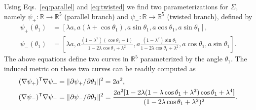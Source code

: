 Using Eqs.~\eqref{eq:parallel} and \eqref{eq:twisted} we find two parameterizations for $\Sigma$, namely $\psi_+: \mathbb{R} \to \mathbb{R}^5$ (parallel branch) and $\psi_-: \mathbb{R} \to \mathbb{R}^5$ (twisted branch), defined by
%
\begin{subequations}
  \begin{align}
    \psi_+(\theta_1) &= \left[\lambda a, a(\lambda + \cos{\theta_1}), a\sin{\theta_1}, a\cos{\theta_1}, a\sin{\theta_1}\right],\label{eq:4bar_param_parallel}\\
    \psi_-(\theta_1) &= \left[\lambda a, a\frac{(1-\lambda^2)(\cos{\theta_1} - 1)}{1-2\lambda\cos{\theta_1}+\lambda^2}, a\frac{(1-\lambda^2)\sin{\theta_1}}{1-2\lambda\cos{\theta_1}+\lambda^2}, a\cos{\theta_1}, a\sin{\theta_1}\right].\label{eq:4bar_param_twisted}
  \end{align}
\end{subequations}
%
The above equations define two curves in $\mathbb{R}^{5}$ parameterized by the angle $\theta_{1}$.
The induced metric on these two curves can be readily computed as
%
\begin{subequations}
  \begin{align}
    (\nabla\psi_{+})^\mathsf{T}\nabla\psi_+ &= \lVert\partial{\psi_{+}}/\partial{\theta_{1}}\rVert^{2} = 2 a^2,\label{eq:4bar_ind1}\\
    (\nabla\psi_{-})^\mathsf{T}\nabla\psi_- &= \lVert\partial{\psi_{-}}/\partial{\theta_{1}}\rVert^{2} = \frac{2a^2[1-2\lambda(1-\lambda\cos{\theta_1}+\lambda^2)\cos{\theta_1} + \lambda^4]}{(1-2\lambda\cos{\theta_1}+ \lambda^2)^2}.\label{eq:4bar_ind2}
  \end{align}
\end{subequations}


